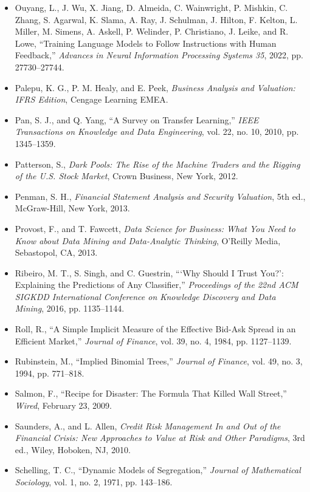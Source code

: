 \documentclass{book}
\begin{document}
\begin{itemize}
    \item Ouyang, L., J. Wu, X. Jiang, D. Almeida, C. Wainwright, P. Mishkin, C. Zhang, S. Agarwal, K. Slama, A. Ray, J. Schulman, J. Hilton, F. Kelton, L. Miller, M. Simens, A. Askell, P. Welinder, P. Christiano, J. Leike, and R. Lowe, ``Training Language Models to Follow Instructions with Human Feedback,'' \emph{Advances in Neural Information Processing Systems 35}, 2022, pp. 27730--27744.
    \item Palepu, K. G., P. M. Healy, and E. Peek, \emph{Business Analysis and Valuation: IFRS Edition}, Cengage Learning EMEA.
    \item Pan, S. J., and Q. Yang, ``A Survey on Transfer Learning,'' \emph{IEEE Transactions on Knowledge and Data Engineering}, vol. 22, no. 10, 2010, pp. 1345--1359.
    \item Patterson, S., \emph{Dark Pools: The Rise of the Machine Traders and the Rigging of the U.S. Stock Market}, Crown Business, New York, 2012.
    \item Penman, S. H., \emph{Financial Statement Analysis and Security Valuation}, 5th ed., McGraw-Hill, New York, 2013.
    \item Provost, F., and T. Fawcett, \emph{Data Science for Business: What You Need to Know about Data Mining and Data-Analytic Thinking}, O'Reilly Media, Sebastopol, CA, 2013.
    \item Ribeiro, M. T., S. Singh, and C. Guestrin, ```Why Should I Trust You?': Explaining the Predictions of Any Classifier,'' \emph{Proceedings of the 22nd ACM SIGKDD International Conference on Knowledge Discovery and Data Mining}, 2016, pp. 1135--1144.
    \item Roll, R., ``A Simple Implicit Measure of the Effective Bid-Ask Spread in an Efficient Market,'' \emph{Journal of Finance}, vol. 39, no. 4, 1984, pp. 1127--1139.
    \item Rubinstein, M., ``Implied Binomial Trees,'' \emph{Journal of Finance}, vol. 49, no. 3, 1994, pp. 771--818.
    \item Salmon, F., ``Recipe for Disaster: The Formula That Killed Wall Street,'' \emph{Wired}, February 23, 2009.
    \item Saunders, A., and L. Allen, \emph{Credit Risk Management In and Out of the Financial Crisis: New Approaches to Value at Risk and Other Paradigms}, 3rd ed., Wiley, Hoboken, NJ, 2010.
    \item Schelling, T. C., ``Dynamic Models of Segregation,'' \emph{Journal of Mathematical Sociology}, vol. 1, no. 2, 1971, pp. 143--186.

\end{itemize}
\end{document}
